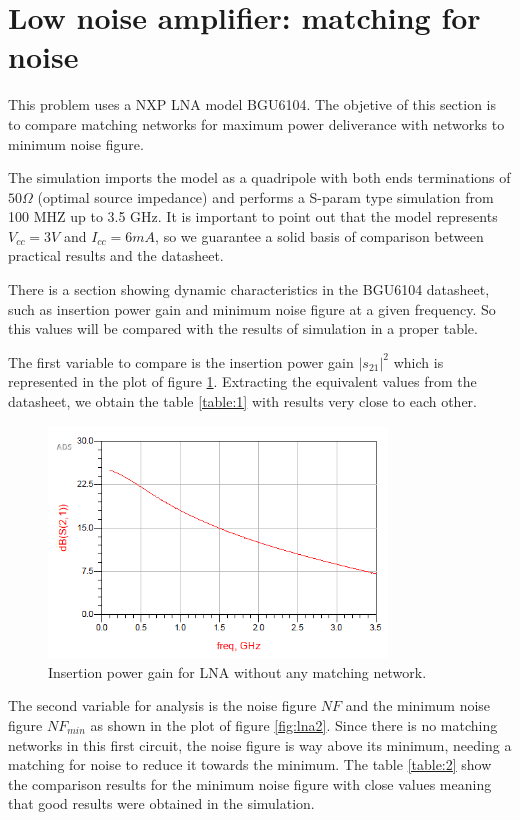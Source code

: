 \section{Low noise amplifier: matching for noise}

This problem uses a NXP LNA model BGU6104. The objetive of this section is to compare matching networks for maximum power deliverance with networks to minimum noise figure.

The simulation imports the model as a quadripole with both ends terminations of $50 \Omega$ (optimal source impedance) and performs a S-param type simulation from 100 MHZ up to 3.5 GHz. It is important to point out that the model represents $V_{cc} = 3V$ and $I_{cc} = 6mA$, so we guarantee a solid basis of comparison between practical results and the datasheet.

There is a section showing dynamic characteristics in the BGU6104 datasheet, such as insertion power gain and minimum noise figure at a given frequency. So this values will be compared with the results of simulation in a proper table.

The first variable to compare is the insertion power gain $|s_{21}|^2$ which is represented in the plot of figure \ref{fig:lna1}. Extracting the equivalent values from the datasheet, we obtain the table \ref{table:1} with results very close to each other.

\begin{figure}[H] 
\centering
\includegraphics[width=9cm]{images/s21_nomatch.png}
\caption{Insertion power gain for LNA without any matching network.}
\label{fig:lna1} 
\end{figure}




The second variable for analysis is the noise figure $NF$ and the minimum noise figure $NF_{min}$ as shown in the plot of figure \ref{fig:lna2}. Since there is no matching networks in this first circuit, the noise figure is way above its minimum, needing a matching for noise to reduce it towards the minimum. The table \ref{table:2} show the comparison results for the minimum noise figure with close values meaning that good results were obtained in the simulation.

